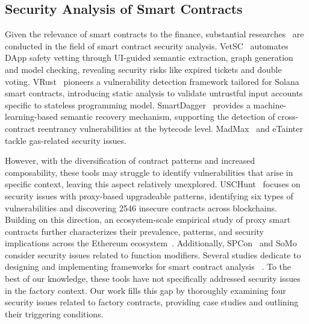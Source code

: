 \documentclass[acmsmall, screen]{acmart}
\begin{document}
	\subsection{Security Analysis of Smart Contracts}
	Given the relevance of smart contracts to the finance, substantial researches~\cite{DBLP:conf/kbse/XueMLSYP20,DBLP:conf/issta/LiaoZCN22,DBLP:conf/issta/GhalebRP22,DBLP:journals/pacmpl/GrechKJBSS18,
		DBLP:conf/uss/0001L21,DBLP:conf/pldi/BrentGLSS20, DBLP:conf/ccs/DuanZPLLX022}
	are conducted in the field of smart contract security analysis. VetSC~\cite{DBLP:conf/ccs/DuanZPLLX022}
	automates DApp safety vetting through UI-guided semantic extraction, graph generation and model
	checking, revealing security risks like expired tickets and double voting. VRust~\cite{DBLP:conf/ccs/CuiZGT022}
	pioneers a vulnerability detection framework tailored for Solana smart contracts, introducing static
	analysis to validate untrustful input accounts specific to stateless programming model.
	SmartDagger~\cite{DBLP:conf/issta/LiaoZCN22} provides a machine-learning-based semantic recovery
	mechanism, supporting the detection of cross-contract reentrancy vulnerabilities at the bytecode
	level. MadMax~\cite{DBLP:journals/pacmpl/GrechKJBSS18} and eTainter~\cite{DBLP:conf/issta/GhalebRP22}
	tackle gas-related security issues.

However, with the diversification of contract patterns and increased composability, these tools
may struggle to identify vulnerabilities that arise in specific context, leaving this aspect relatively
unexplored. USCHunt~\cite{DBLP:conf/uss/BodellMD23} focuses on security issues with proxy-based
upgradeable patterns, identifying six types of vulnerabilities and discovering 2546 insecure contracts
across blockchains. Building on this direction, an ecosystem-scale empirical study of proxy smart
	contracts further characterizes their prevalence, patterns, and security implications across the
	Ethereum ecosystem~\cite{proxy-empirical-ecosystem}. Additionally, SPCon~\cite{DBLP:conf/issta/LiuL0A22}
	and SoMo ~\cite{DBLP:conf/issta/FangWYWCCLJ23} consider security issues related to function
	modifiers. Several studies dedicate to designing and implementing frameworks for smart contract analysis~
	\cite{DBLP:conf/icse/FeistGG19,DBLP:conf/kbse/FerreiraCDA20,DBLP:conf/sp/SoLPLO20}. To the best of
	our knowledge, these tools have not specifically addressed security issues in the factory
	context. Our work fills this gap by thoroughly examining four security issues related to factory
	contracts, providing case studies and outlining their triggering conditions.
\end{document}
